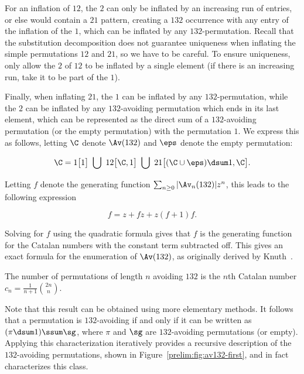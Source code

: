 \documentclass[12pt,twoside]{memoir}
\begin{document}
      For an inflation of $12$, the $2$ can only be inflated by an
      increasing run of entries, or else would contain a $21$ pattern, creating a
      $132$ occurrence with any entry of the inflation of the $1$, which can be
      inflated by any $132$-permutation.  Recall that the substitution
      decomposition does not guarantee uniqueness when inflating the simple
      permutations $12$ and $21$, so we have to be careful. To ensure uniqueness,
      only allow the $2$ of $12$ to be inflated by a single element (if there is
      an increasing run, take it to be part of the $1$). 


      Finally, when inflating $21$, the $1$ can be inflated by any
      $132$-permutation, while the $2$ can be inflated by any $132$-avoiding
      permutation which ends in its last element, which can be represented as the
      direct sum of a $132$-avoiding permutation (or the empty permutation) with
      the permutation $1$. We express this as follows, letting $\C$ denote $\Av
      (132)$ and $\eps$ denote the empty permutation:

      $$ \C =  1\big[1\big] \ \bigcup \ 12\big[\C, 1\big] \ \bigcup \
          21\big[(\C \cup \eps) \dsum 1, \C\big]. $$

      Letting $f$ denote the generating function $\sum_{n \geq 0} |\Av_n (132)|
      z^n$, this leads to the following expression

      $$ f =  z + fz  + z(f+1)f .$$

      Solving for $f$ using the quadratic formula gives that $f$ is the generating
      function for the Catalan numbers with the constant term subtracted off.
      This gives an exact formula for the enumeration of $\Av (132)$, 
      as originally derived by Knuth~\cite{Knuth}. 
      
      \begin{theorem} \label{prelim:thm:av132}
        The number of permutations of length $n$ avoiding $132$ is the $n$th Catalan
        number $c_n = \frac{1}{n+1}\binom{2n}{n}$. 
      \end{theorem}


      Note that this result can be obtained using more elementary methods. 
      It follows that a permutation is $132$-avoiding if and only if it can be
      written as $(\pi \dsum 1) \ssum \sg$, where $\pi$ and $\sg$ are
      $132$-avoiding permutations (or empty). Applying this characterization
      iteratively provides a recursive description of the $132$-avoiding
      permutations, shown in Figure~\ref{prelim:fig:av132-first}, and in fact
      characterizes this class.
\end{document}
